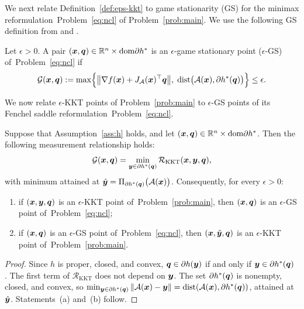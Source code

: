 We next relate Definition~\ref{def:eps-kkt} to game stationarity (GS) for the
minimax reformulation~Problem~\eqref{eq:ncl} of Problem~\eqref{prob:main}. We use the
following GS definition from \cite[Definition~3.1(b)]{li2025nonsmooth} and
\cite[(2.10)--(2.11)]{zhang2026matching}.
\begin{definition}
\label{def:eps-gs}
Let \(\epsilon>0\). A pair \((\bm{x},\bm{q})\in\mathbb{R}^n\times\mathrm{dom}\partial h^*\) is an
\(\epsilon\)-game stationary point (\(\epsilon\)-GS) of~Problem~\eqref{eq:ncl} if
\[
    \mathcal{G}(\bm{x},\bm{q})
    :=
    \max\Bigl\{
        \bigl\|\nabla f(\bm{x})+J_{\mathcal{A}}(\bm{x})^\top\bm{q}\bigr\|,\;
        \operatorname{dist}\bigl(\mathcal{A}(\bm{x}),\partial h^*(\bm{q})\bigr)
    \Bigr\}
    \le\epsilon .
\]
\end{definition}
We now relate $\epsilon$-KKT points of Problem~\eqref{prob:main}
to $\epsilon$-GS points of its Fenchel saddle reformulation~Problem~\eqref{eq:ncl}. 
\begin{proposition}
\label{prop:kkt-gs}
Suppose that Assumption~\ref{ass:h} holds, and let
\((\bm{x},\bm{q})\in\mathbb{R}^n\times\mathrm{dom}\partial h^*\). Then the following measurement relationship holds: 
\[
    \mathcal{G}(\bm{x},\bm{q})
    =
    \min_{\bm{y}\in\partial h^*(\bm{q})}
    \mathcal{R}_{\mathrm{KKT}}(\bm{x},\bm{y},\bm{q}),
\]
with minimum attained at
\(\hat{\bm{y}}=\Pi_{\partial h^*(\bm{q})}\bigl(\mathcal{A}(\bm{x})\bigr)\). Consequently, for
every \(\epsilon>0\):
\begin{enumerate}[label=(\alph*)]
\item if \((\bm{x},\bm{y},\bm{q})\) is an \(\epsilon\)-KKT point
  of~Problem~\eqref{prob:main}, then \((\bm{x},\bm{q})\) is an \(\epsilon\)-GS point
  of~Problem~\eqref{eq:ncl};
\item if \((\bm{x},\bm{q})\) is an \(\epsilon\)-GS point of~Problem~\eqref{eq:ncl}, then
  \((\bm{x},\hat{\bm{y}},\bm{q})\) is an \(\epsilon\)-KKT point of~Problem~\eqref{prob:main}.
\end{enumerate}
\end{proposition}

\begin{proof}
Since \(h\) is proper, closed, and convex,
\(\bm{q}\in\partial h(\bm{y})\) if and only if \(\bm{y}\in\partial h^*(\bm{q})\)
\cite[Theorem~23.5]{rockafellar1970convex}. The first term of
\(\mathcal{R}_{\mathrm{KKT}}\) does not depend on \(\bm{y}\). The set
\(\partial h^*(\bm{q})\) is nonempty, closed, and convex, so
\(\min_{\bm{y}\in\partial h^*(\bm{q})}\|\mathcal{A}(\bm{x})-\bm{y}\|
=\operatorname{dist}(\mathcal{A}(\bm{x}),\partial h^*(\bm{q}))\), attained at \(\hat{\bm{y}}\).
Statements~(a) and~(b) follow.
\end{proof}

